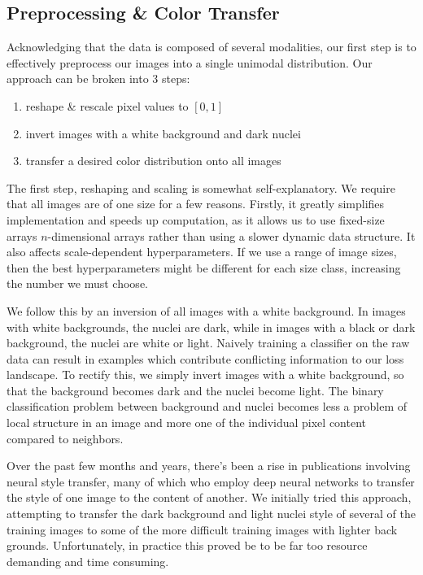 \documentclass[paper=letter, fontsize=12pt]{article}
\numberwithin{equation}{section} %
\numberwithin{figure}{section} %
\numberwithin{table}{section} %
\begin{document}
\subsection{Preprocessing \& Color Transfer}

Acknowledging that the data is composed of several modalities, our first step
is to effectively preprocess our images into a single unimodal distribution.
Our approach can be broken into 3 steps:
\begin{enumerate}
    \item reshape \& rescale pixel values to $[0, 1]$
    \item invert images with a white background and dark nuclei
    \item transfer a desired color distribution onto all images
\end{enumerate}

The first step, reshaping and scaling is somewhat self-explanatory.  We require
that all images are of one size for a few reasons.  Firstly, it greatly
simplifies implementation and speeds up computation, as it allows us to use
fixed-size arrays $n$-dimensional arrays rather than using a slower dynamic
data structure.  It also affects scale-dependent hyperparameters.  If we use a
range of image sizes, then the best hyperparameters might be different for each
size class, increasing the number we must choose.

We follow this by an inversion of all images with a white background.  In
images with white backgrounds, the nuclei are dark, while in images with a
black or dark background, the nuclei are white or light.  Naively training a
classifier on the raw data can result in examples which contribute conflicting
information to our loss landscape.  To rectify this, we simply invert images
with a white background, so that the background becomes dark and the nuclei
become light.  The binary classification problem between background and nuclei
becomes less a problem of local structure in an image and more one of
the individual pixel content compared to neighbors.

Over the past few months and years, there's been a rise in publications
involving neural style transfer, many of which who employ deep neural networks
to transfer the style of one image to the content of another. We initially
tried this approach, attempting to transfer the dark background and light
nuclei style of several of the training images to some of the more difficult
training images with lighter back grounds. Unfortunately, in practice this
proved be to be far too resource demanding and time consuming.
\end{document}
